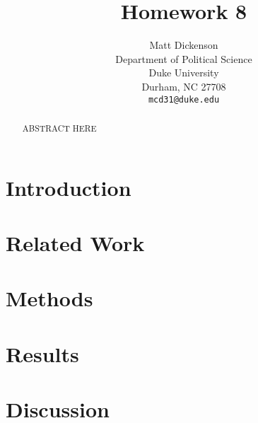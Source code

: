 \documentclass[12pt,letterpaper]{article} %
\title{Homework 8}
\author{
Matt Dickenson\\
Department of Political Science\\
Duke University\\
Durham, NC 27708 \\
\texttt{mcd31@duke.edu}
}
\begin{document}
\maketitle

\begin{abstract}
ABSTRACT HERE
\end{abstract}



\section{Introduction}

\section{Related Work}

\section{Methods}








\section{Results}

\section{Discussion}
\end{document}
